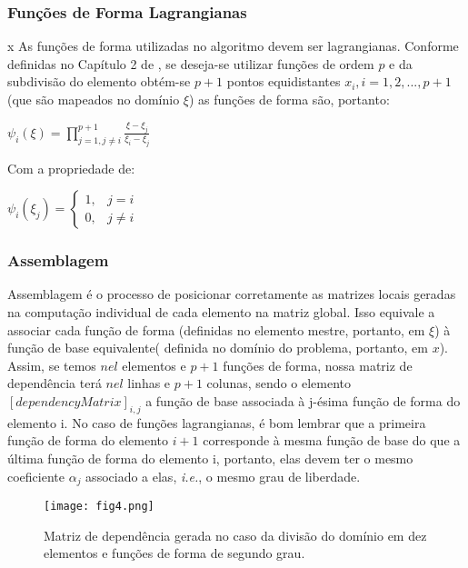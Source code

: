 \documentclass[11pt, oneside, hidelinks]{article}   	%
\begin{document}
\subsubsection{Funções de Forma Lagrangianas}x
As funções de forma utilizadas no algoritmo devem ser lagrangianas. Conforme definidas no Capítulo 2 de \citet{oden81}, se deseja-se utilizar funções de ordem $p$ e da subdivisão do elemento obtém-se $p+1$  pontos equidistantes $x_{i},i=1,2,...,p+1$(que são mapeados no domínio $\xi$) as funções de forma são, portanto:

\centerline{$\psi_{i}(\xi)=\prod_{j=1,j\neq i}^{p+1}\frac{\xi-\xi_{j}}{\xi_{i}-\xi_{j}}$} 

Com a propriedade de: 
		
 \centerline{$\psi_{i}(\xi_{j})	=\begin{cases} 
 1, & j=i\\ 
 0, & j\neq i
 \end{cases}	$}		
 \subsubsection{Assemblagem}
 \label{sub:assemblagem}
 Assemblagem é o processo de posicionar corretamente as matrizes locais geradas na computação individual de cada elemento na matriz global. Isso equivale a associar cada função de forma (definidas no elemento mestre, portanto, em $\xi$) à função de base equivalente( definida no domínio do problema, portanto, em $x$). Assim, se temos $nel$ elementos e $p+1$ funções de forma, nossa matriz de dependência terá $nel$ linhas e $p+1$ colunas, sendo o elemento $[dependencyMatrix]_{i,j}$  a função de base associada à j-ésima função de forma do elemento i. No caso de funções lagrangianas, é bom lembrar que a primeira função de forma do elemento $i+1$ corresponde à mesma função de base do que a última função de forma do elemento i, portanto, elas devem ter o mesmo coeficiente $\alpha_{j}$ associado a elas, \emph{i.e.}, o mesmo grau de liberdade.
 \begin{figure}[h!]
  \centering
      \texttt{[image: fig4.png]}
  \caption{Matriz de dependência gerada no caso da divisão do domínio em dez elementos e funções de forma de segundo grau.}
  \label{fig:dependencymatrix}
\end{figure}
\end{document}
